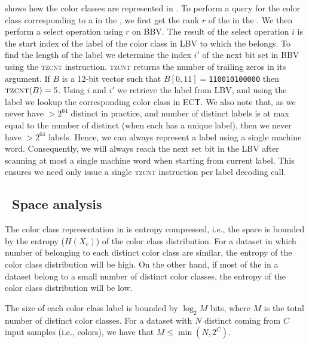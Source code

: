  shows how the color classes are represented in \system. To
perform a query for the color class corresponding to a \kmer in the \cdbg, we
first get the rank $r$ of the \kmer in the \dbg. We then perform a select
operation using $r$ on BBV. The result of the select operation $i$ is the start
index of the label of the color class in LBV to which the \kmer belongs.
%
To find the length of the label we determine the index $i'$ of the next bit set
in BBV using the \textsc{tzcnt} instruction.
%
\textsc{tzcnt} returns the number of trailing zeros in its argument. If $B$ is a
12-bit vector such that $B[0,11]=$\texttt{110010100000} then
$\textsc{tzcnt}(B)=5$.
%
%
Using $i$ and $i'$ we retrieve the label from LBV, and using
the label we lookup the corresponding color class in ECT.
%
We also note that, as we never have $> 2^{64}$ distinct \kmers in practice, and
number of distinct labels is at max equal to the number of distinct \kmers (when
each \kmer has a unique label), then we never have $> 2^{64}$ labels. Hence, we can
always represent a label using a single machine word. Consequently, we will
always reach the next set bit in the LBV after scanning at most a single machine
word when starting from current label. This ensures we need only issue a single
\textsc{tzcnt} instruction per label decoding call.


\subsection{~Space analysis}
\label{system-space-bound}

The color class representation in \system is entropy compressed, i.e.,
the space is bounded by the entropy ($H(X_c)$) of the color class distribution. 
For a dataset in which number of \kmers belonging to each distinct color class are
similar, the entropy of the color class distribution will be high. On the other
hand, if most of the \kmers in a dataset belong to a small number of distinct
color classes, the entropy of the color class distribution will be low.

\begin{lemma}
  The size of each color class label is bounded by $\log_2{M}$ bits, where
  $M$ is the total number of distinct color classes. For a dataset with $N$
  distinct \kmers coming from $C$ input samples (i.e., colors), we have that $M
  \leq \min(N,2^C)$.
  \label{label-size-bound}
\end{lemma}

